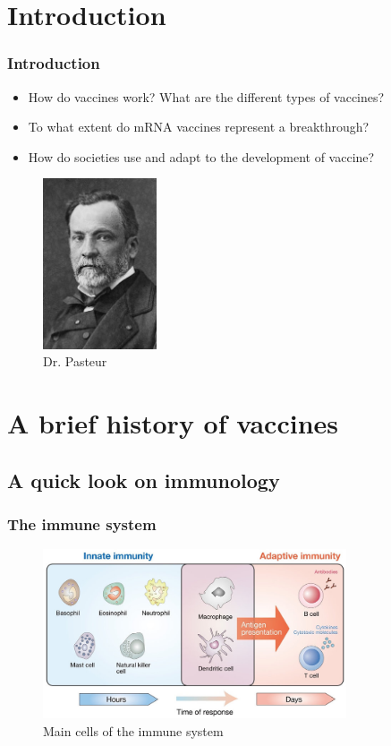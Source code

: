 \section*{Introduction}


\begin{frame}
    \frametitle{Introduction}
    \begin{itemize}
        \item How do vaccines work? What are the different types of vaccines?
        \item To what extent do mRNA vaccines represent a breakthrough?
        \item How do societies use and adapt to the development of vaccine?
    \end{itemize}

    \begin{figure}
        \centering
        \includegraphics[width=0.3\textwidth]{imgs/paster.jpg}
        \caption{Dr. Pasteur}
        \label{fig:responses4}
    \end{figure}

\end{frame}

\section{A brief history of vaccines}
\subsection{A quick look on immunology}


\begin{frame}
    \frametitle{The immune system}
\begin{figure}
    \centering
    \includegraphics[width=0.8\textwidth]{imgs/ImmunityCells.png}
    \caption{Main cells of the immune system \autocite{yamauchiHippoPathwayMammalian2019}}
    \label{fig:responses3}
\end{figure}
\end{frame}

